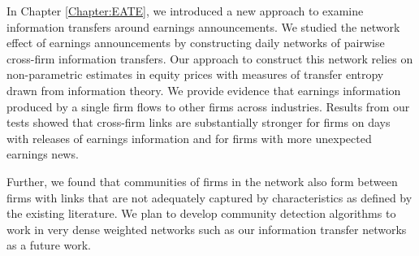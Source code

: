 
In Chapter \ref{Chapter:EATE}, we introduced a new approach to examine information transfers around earnings announcements.  We studied the network effect of earnings announcements by constructing daily networks of pairwise cross-firm information transfers.  Our approach to construct this network relies on non-parametric estimates in equity prices with measures of transfer entropy drawn from information theory.  We provide evidence that earnings information produced by a single firm flows to other firms across industries.  Results from our tests showed that cross-firm links are substantially stronger for firms on days with releases of earnings information and for firms with more unexpected earnings news.


Further,  we found that communities of firms in the network also form between firms with links that are not adequately captured by characteristics as defined by the existing literature.  We plan to develop community detection algorithms to work in very dense weighted networks such as our information transfer networks as a  future work.  %



%
%


